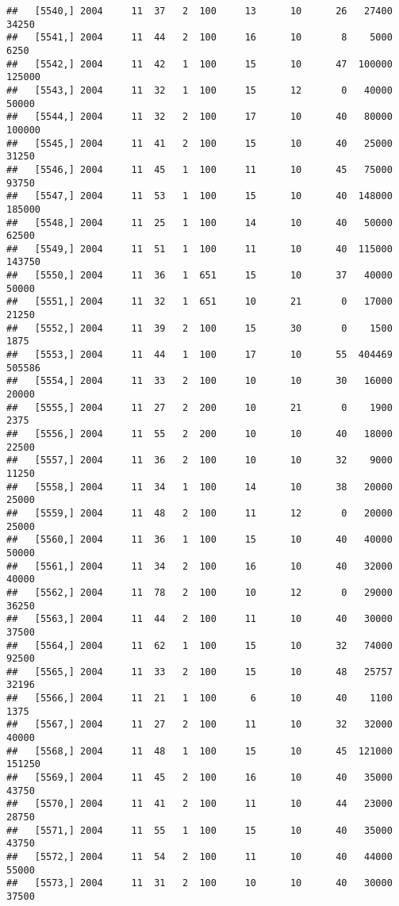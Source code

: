 \documentclass{article}\usepackage[]{graphicx}\usepackage[]{color}
\makeatletter
\newenvironment{kframe}{%
 \def\at@end@of@kframe{}%
 \ifinner\ifhmode%
  \def\at@end@of@kframe{\end{minipage}}%
  \begin{minipage}{\columnwidth}%
 \fi\fi%
 \def\FrameCommand##1{\hskip\@totalleftmargin \hskip-\fboxsep
 \colorbox{shadecolor}{##1}\hskip-\fboxsep
     \hskip-\linewidth \hskip-\@totalleftmargin \hskip\columnwidth}%
 \MakeFramed {\advance\hsize-\width
   \@totalleftmargin\z@ \linewidth\hsize
   \@setminipage}}%
 {\par\unskip\endMakeFramed%
 \at@end@of@kframe}
\newenvironment{knitrout}{}{} %
\makeatother
\begin{document}
\begin{knitrout}
\begin{kframe}
\begin{verbatim}
##   [5540,] 2004     11  37   2  100     13      10      26   27400   34250
##   [5541,] 2004     11  44   2  100     16      10       8    5000    6250
##   [5542,] 2004     11  42   1  100     15      10      47  100000  125000
##   [5543,] 2004     11  32   1  100     15      12       0   40000   50000
##   [5544,] 2004     11  32   2  100     17      10      40   80000  100000
##   [5545,] 2004     11  41   2  100     15      10      40   25000   31250
##   [5546,] 2004     11  45   1  100     11      10      45   75000   93750
##   [5547,] 2004     11  53   1  100     15      10      40  148000  185000
##   [5548,] 2004     11  25   1  100     14      10      40   50000   62500
##   [5549,] 2004     11  51   1  100     11      10      40  115000  143750
##   [5550,] 2004     11  36   1  651     15      10      37   40000   50000
##   [5551,] 2004     11  32   1  651     10      21       0   17000   21250
##   [5552,] 2004     11  39   2  100     15      30       0    1500    1875
##   [5553,] 2004     11  44   1  100     17      10      55  404469  505586
##   [5554,] 2004     11  33   2  100     10      10      30   16000   20000
##   [5555,] 2004     11  27   2  200     10      21       0    1900    2375
##   [5556,] 2004     11  55   2  200     10      10      40   18000   22500
##   [5557,] 2004     11  36   2  100     10      10      32    9000   11250
##   [5558,] 2004     11  34   1  100     14      10      38   20000   25000
##   [5559,] 2004     11  48   2  100     11      12       0   20000   25000
##   [5560,] 2004     11  36   1  100     15      10      40   40000   50000
##   [5561,] 2004     11  34   2  100     16      10      40   32000   40000
##   [5562,] 2004     11  78   2  100     10      12       0   29000   36250
##   [5563,] 2004     11  44   2  100     11      10      40   30000   37500
##   [5564,] 2004     11  62   1  100     15      10      32   74000   92500
##   [5565,] 2004     11  33   2  100     15      10      48   25757   32196
##   [5566,] 2004     11  21   1  100      6      10      40    1100    1375
##   [5567,] 2004     11  27   2  100     11      10      32   32000   40000
##   [5568,] 2004     11  48   1  100     15      10      45  121000  151250
##   [5569,] 2004     11  45   2  100     16      10      40   35000   43750
##   [5570,] 2004     11  41   2  100     11      10      44   23000   28750
##   [5571,] 2004     11  55   1  100     15      10      40   35000   43750
##   [5572,] 2004     11  54   2  100     11      10      40   44000   55000
##   [5573,] 2004     11  31   2  100     10      10      40   30000   37500

\end{verbatim}
\end{kframe}
\end{knitrout}
\end{document}
